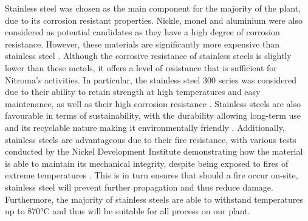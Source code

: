Stainless steel was chosen as the main component for the majority of the plant, due to its corrosion resistant properties. Nickle, monel and aluminium were also considered as potential candidates as they have a high degree of corrosion resistance. However, these materials are significantly more expensive than stainless steel \cite{sinnott_coulson_2005}. Although the corrosive resistance of stainless steels is slightly lower than these metals, it offers a level of resistance that is sufficient for Nitroma's activities. In particular, the stainless steel 300 series was considered due to their ability to retain strength at high temperatures and easy maintenance, as well as their high corrosion resistance \cite{national_electronic_alloys_300_2021}. Stainless steels are also favourable in terms of sustainability, with the durability allowing long-term use and its recyclable nature making it environmentally friendly \cite{osterman_stainless_2013}. Additionally, stainless steels are advantageous due to their fire resistance, with various tests conducted by the Nickel Development Institute demonstrating how the material is able to maintain its mechanical integrity, despite being exposed to fires of extreme temperatures \cite{waller_stainless_1990}. This is in turn ensures that should a fire occur on-site, stainless steel will prevent further propagation and thus reduce damage.  Furthermore, the majority of stainless steels are able to withstand temperatures up to 870°C and thus will be suitable for all process on our plant. 


